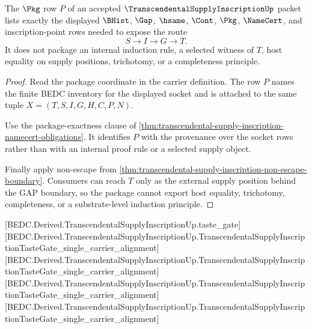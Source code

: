 \begin{theorem}
\label{thm:transcendental-supply-inscription-package-exactness}
The $\Pkg$ row $P$ of an accepted $\TranscendentalSupplyInscriptionUp$ packet lists exactly the displayed $\BHist$, $\Gap$, $\hsame$, $\Cont$, $\Pkg$, $\NameCert$, and inscription-point rows needed to expose the route
$$
S \to I \to G \to T.
$$
It does not package an internal induction rule, a selected witness of $T$, host equality on supply positions, trichotomy, or a completeness principle.
\end{theorem}
\begin{proof}
Read the package coordinate in the carrier definition. The row $P$ names the finite BEDC inventory for the displayed socket and is attached to the same tuple $X=(T,S,I,G,H,C,P,N)$.

Use the package-exactness clause of \autoref{thm:transcendental-supply-inscription-namecert-obligations}. It identifies $P$ with the provenance over the socket rows rather than with an internal proof rule or a selected supply object.

Finally apply non-escape from \autoref{thm:transcendental-supply-inscription-non-escape-boundary}. Consumers can reach $T$ only as the external supply position behind the GAP boundary, so the package cannot export host equality, trichotomy, completeness, or a substrate-level induction principle.
\end{proof}

[BEDC.Derived.TranscendentalSupplyInscriptionUp.taste\_gate]
[BEDC.Derived.TranscendentalSupplyInscriptionUp.TranscendentalSupplyInscriptionTasteGate\_single\_carrier\_alignment]
[BEDC.Derived.TranscendentalSupplyInscriptionUp.TranscendentalSupplyInscriptionTasteGate\_single\_carrier\_alignment]
[BEDC.Derived.TranscendentalSupplyInscriptionUp.TranscendentalSupplyInscriptionTasteGate\_single\_carrier\_alignment]
[BEDC.Derived.TranscendentalSupplyInscriptionUp.TranscendentalSupplyInscriptionTasteGate\_single\_carrier\_alignment]

